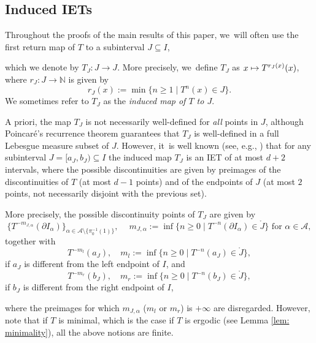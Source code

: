 \documentclass[10pt,a4paper]{amsart}
\newcommand\mto{\mathchoice{\longmapsto}{\mapsto}{\mapsto}{\mapsto}}
\theoremstyle{plain}
\theoremstyle{definition}
\newcommand{\A}{\mathcal{A}}
\newcommand{\N}{\mathbb{N}}
\begin{document}
\subsection{Induced IETs}\label{sc:induced_IETs}
Throughout the proofs of the main results of this paper, we~will often use the first return map of $T$ to a subinterval $J \subseteq I$, {which we denote by $T_J: J \to J$. More precisely, we~define $T_J$ as $x \mto T^{r_J(x)}(x)$, where $r_J: J \to \N$ is given by
\[
 r_J(x):= \min\{n \geq 1 \mid T^n(x) \in J\}.
\]
We sometimes refer to $T_J$ as the \emph{induced map of $T$ to $J$}.

A priori, the map $T_J$ is not necessarily well-defined for \emph{all} points in $J$, although Poincaré's recurrence theorem guarantees that $T_J$ is well-defined in a full Lebesgue measure subset of $J$. However, it~is well known (see, e.g., \cite[\S 3]{veech_interval_1978}) that for any subinterval $J=[a_J,b_J)\subseteq I$ the induced map $T_J$ is an IET of at most $d+2$ intervals, where the possible discontinuities are given by preimages of the discontinuities of $T$ (at most $d - 1$ points) and of the endpoints of $J$ (at most $2$ points, not necessarily disjoint with the previous set).

More precisely, the possible discontinuity points of $T_J$ are given by
\[
\{T^{-m_{J,\alpha}}(\partial I_{\alpha})\}_{\alpha\in \A \setminus \{\pi_0^{-1}(1)\}}, \quad\ m_{J,\alpha}:=\inf\{n\geq 0 \mid T^{-n}(\partial I_{\alpha})\in \mathring{J}\} \text{ \ for } \alpha \in \A,
\]
together with
\[
T^{-m_l}(a_J), \quad m_l :=\inf\{n\ge 0 \mid T^{-n}(a_J)\in \mathring{J}\},
\]
if $a_J$ is different from the left endpoint of $I$, and
\[
T^{-m_r}(b_J), \quad m_r :=\inf\{n\ge 0 \mid T^{-n}(b_J)\in \mathring{J}\},
\]
if $b_J$ is different from the right endpoint of $I$,} where the preimages for
which $m_{J, \alpha}$ (\resp $m_l$ or $m_r$) is $+\infty$ are disregarded.
However, note that if $T$ is minimal, which is the case if $T$ is ergodic (see
Lemma \ref{lem: minimality}), all the above notions are finite.
\end{document}
